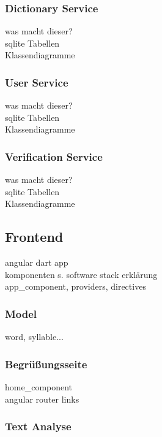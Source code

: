 \subsubsection{Dictionary Service}

was macht dieser?\\
sqlite Tabellen\\
Klassendiagramme\\

\subsubsection{User Service}
was macht dieser?\\
sqlite Tabellen\\
Klassendiagramme\\

\subsubsection{Verification Service}
was macht dieser?\\
sqlite Tabellen\\
Klassendiagramme\\


\subsection{Frontend}

angular dart app\\
komponenten s. software stack erklärung\\

app\_component, providers, directives\\

\subsubsection{Model}
word, syllable...

\subsubsection{Begrüßungsseite}

home\_component\\
angular router links

\subsubsection{Text Analyse}

